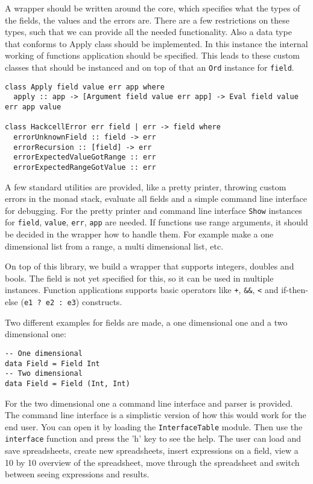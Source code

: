 \documentclass{article}
\begin{document}
	A wrapper should be written around the core, which specifies what the types of the fields, the values and the errors are. There are a few restrictions on these types, such that we can provide all the needed functionality. Also a data type that conforms to Apply class should be implemented. In this instance the internal working of functions application should be specified. This leads to these custom classes that should be instanced and on top of that an \texttt{Ord} instance for \texttt{field}.
\begin{verbatim}
class Apply field value err app where
  apply :: app -> [Argument field value err app] -> Eval field value err app value
  
class HackcellError err field | err -> field where
  errorUnknownField :: field -> err
  errorRecursion :: [field] -> err
  errorExpectedValueGotRange :: err
  errorExpectedRangeGotValue :: err
\end{verbatim}
	
	A few standard utilities are provided, like a pretty printer, throwing custom errors in the monad stack, evaluate all fields and a simple command line interface for debugging. For the pretty printer and command line interface \texttt{Show} instances for \texttt{field}, \texttt{value}, \texttt{err}, \texttt{app} are needed. If functions use range arguments, it should be decided in the wrapper how to handle them. For example make a one dimensional list from a range, a multi dimensional list, etc.
	
	On top of this library, we build a wrapper that supports integers, doubles and bools. The field is not yet specified for this, so it can be used in multiple instances. Function applications supports basic operators like \texttt{+}, \texttt{\&\&}, \texttt{<} and if-then-else (\texttt{e1 ? e2 : e3}) constructs.
	
	Two different examples for fields are made, a one dimensional one and a two dimensional one:
\begin{verbatim}
-- One dimensional
data Field = Field Int
-- Two dimensional
data Field = Field (Int, Int)
\end{verbatim}
	
	For the two dimensional one a command line interface and parser is provided. The command line interface is a simplistic version of how this would work for the end user. You can open it by loading the \texttt{InterfaceTable} module. Then use the \texttt{interface} function and press the 'h' key to see the help. The user can load and save spreadsheets, create new spreadsheets, insert expressions on a field, view a 10 by 10 overview of the spreadsheet, move through the spreadsheet and switch between seeing expressions and results. 
\end{document}
